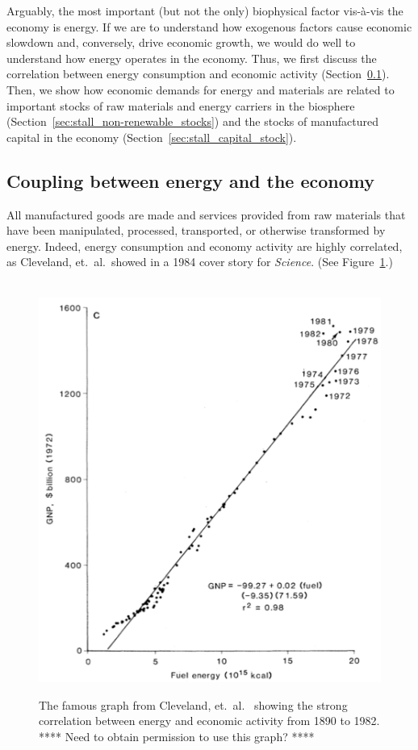Arguably, the most important (but not the only) biophysical factor 
vis-\`{a}-vis the economy is energy.
If we are to understand how exogenous factors cause economic slowdown
and, conversely, drive economic growth,
we would do well to understand how energy operates in the economy.
Thus, we first discuss the correlation 
between energy consumption and economic activity 
(Section~\ref{sec:energy-economy_coupling}).
Then, we show how economic demands for energy and materials
are related to important stocks 
of raw materials and energy carriers in the biosphere 
(Section~\ref{sec:stall_non-renewable_stocks})
and the stocks of manufactured capital in the economy
(Section~\ref{sec:stall_capital_stock}).


\subsection{Coupling between energy and the economy}
\label{sec:energy-economy_coupling}

All manufactured goods are made and services provided
from raw materials that have been
manipulated, processed, transported, or otherwise transformed by energy.
Indeed, energy consumption and economy activity are highly correlated,
as Cleveland, et.\ al.\ showed in a 1984 cover story for \emph{Science}. 
(See Figure~\ref{fig:Cleveland1984}.)

\begin{figure}[!ht]
\centering\
\includegraphics[width=\linewidth]{Part_0/Chapter_Introduction/images/Cleveland1984.pdf}
\caption[Energy and economic activity]{The famous graph from Cleveland, et.\ al.\
\cite{Cleveland:1984aa} showing the strong correlation 
between energy and economic activity from 1890 to 1982.
**** Need to obtain permission to use this graph? ****}
\label{fig:Cleveland1984}
\end{figure}

